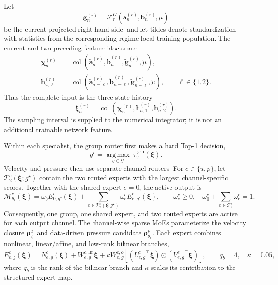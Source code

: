 Let
\begin{equation}
  \bm g_n^{(r)}
  =\mathcal F_r^G\!\left(
      \bm a_n^{(r)},\bm b_n^{(r)};\mu
    \right)
  \label{eq:app_galerkin_feature}
\end{equation}
be the current projected right-hand side, and let tildes denote
standardization with statistics from the corresponding regime-local training
population. The current and two preceding feature blocks are
\begin{align}
  \bm\chi_n^{(r)}
  &=\operatorname{col}\!\left(
      \widetilde{\bm a}_n^{(r)},
      \widetilde{\bm b}_n^{(r)},
      \widetilde{\bm g}_n^{(r)},
      \widetilde\mu
    \right),
  \label{eq:app_current_feature_block}\\
  \bm h_{n,\ell}^{(r)}
  &=\operatorname{col}\!\left(
      \widetilde{\bm a}_{n-\ell}^{(r)},
      \widetilde{\bm b}_{n-\ell}^{(r)},
      \widetilde{\bm g}_{n-\ell}^{(r)},
      \widetilde\mu
    \right),
  \qquad \ell\in\{1,2\}.
  \label{eq:app_history_feature_blocks}
\end{align}
Thus the complete input is the three-state history
\begin{equation}
  \bm\xi_n^{(r)}
  =\operatorname{col}\!\left(
      \bm\chi_n^{(r)},\bm h_{n,1}^{(r)},\bm h_{n,2}^{(r)}
    \right).
  \label{eq:app_specialist_features}
\end{equation}
The sampling interval is supplied to the numerical integrator; it is not an
additional trainable network feature.

Within each specialist, the group router first makes a hard Top-1 decision,
\begin{equation}
  g^\star
  =\underset{g\in\mathcal G}{\operatorname{arg\,max}}
    \;\pi_g^{\mathrm{grp}}(\bm\xi).
  \label{eq:app_group_top1}
\end{equation}
Velocity and pressure then use separate channel routers. For
$c\in\{u,p\}$, let $\mathcal T_2^c(\bm\xi;g^\star)$ contain the two routed
experts with the largest channel-specific scores. Together with the shared
expert $e=0$, the active output is
\begin{equation}
  \mathcal M^c_{\theta_r}(\bm\xi)
  =\omega_0^c E^c_{0,g^\star}(\bm\xi)
  +\sum_{e\in\mathcal T_2^c(\bm\xi;g^\star)}
     \omega_e^c E^c_{e,g^\star}(\bm\xi),
  \qquad
  \omega_e^c\geq0,
  \quad
  \omega_0^c+\sum_{e\in\mathcal T_2^c}\omega_e^c=1.
  \label{eq:app_channel_sparse_moe}
\end{equation}
Consequently, one group, one shared expert, and two routed experts are active
for each output channel. The channel-wise sparse MoEs parameterize the velocity
closure $\bm\rho^u_{\theta_r}$ and data-driven pressure candidate
$\bm\rho^p_{\theta_r}$. Each expert combines nonlinear, linear/affine, and
low-rank bilinear branches,
\begin{equation}
  E^c_{e,g}(\bm\xi)
  =N^c_{e,g}(\bm\xi)
   +W^{c,\mathrm{lin}}_{e,g}\bm\xi
   +\kappa W^{c,o}_{e,g}
    \left[
      \left({U^c_{e,g}}^\top\bm\xi\right)
      \odot
      \left({V^c_{e,g}}^\top\bm\xi\right)
    \right],
  \qquad q_b=4,\quad \kappa=0.05,
  \label{eq:app_structured_expert}
\end{equation}
where $q_b$ is the rank of the bilinear branch and $\kappa$ scales its
contribution to the structured expert map.

